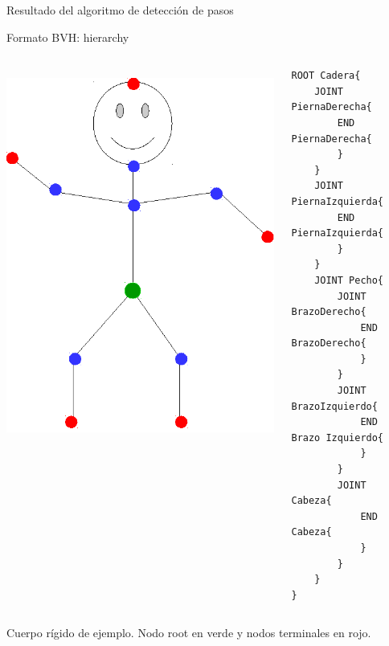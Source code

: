 \documentclass[aspectratio=169,spanish]{beamer} %
\begin{document}
\begin{frame}{Resultado del algoritmo de detección de pasos}
    
\end{frame}

\begin{frame}[fragile]{Formato BVH: hierarchy}
    \begin{columns}
    \includegraphics[height = 0.70\textwidth]{../report/imagenes/palitos}
    {\tiny
    \begin{verbatim}
ROOT Cadera{
    JOINT PiernaDerecha{
        END PiernaDerecha{
        }
    }
    JOINT PiernaIzquierda{
        END PiernaIzquierda{
        }
    }
    JOINT Pecho{
        JOINT BrazoDerecho{
            END BrazoDerecho{
            }
        }
        JOINT BrazoIzquierdo{
            END Brazo Izquierdo{
            }
        }
        JOINT Cabeza{
            END Cabeza{
            }
        }
    }
}
    \end{verbatim}    
    }
    \end{columns}
    Cuerpo rígido de ejemplo. Nodo root en verde y nodos terminales en rojo. 
\end{frame}
\end{document}
